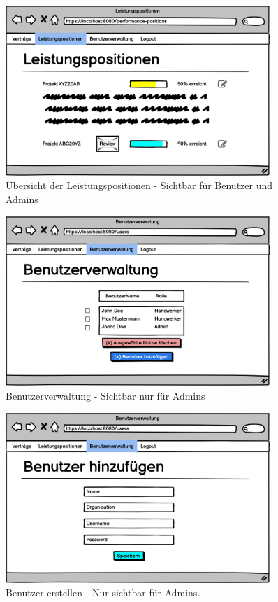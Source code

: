 \begin{figure}[h]
\centering
\includegraphics[width=10cm]{img/mockup_web/admin-und-benutzer-leistungspositionen.png}
\caption{Übersicht der Leistungspositionen - Sichtbar für Benutzer und Admins}
\end{figure}

\begin{figure}[h]
\centering
\includegraphics[width=10cm]{img/mockup_web/admin-benutzerverwaltung.png}
\caption{Benutzerverwaltung - Sichtbar nur für Admins}
\end{figure}

\begin{figure}[h]
\centering
\includegraphics[width=10cm]{img/mockup_web/admin-nutzer-erstellung.png}
\caption{Benutzer erstellen - Nur sichtbar für Admins.}
\end{figure}